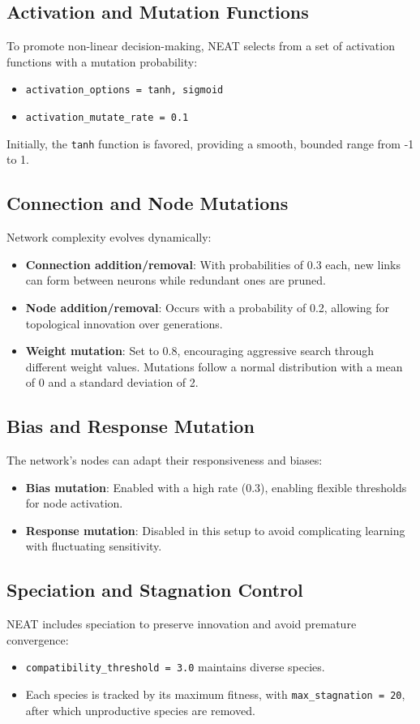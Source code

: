 \documentclass[sigconf]{acmart}
\begin{document}
\subsection{Activation and Mutation Functions}
To promote non-linear decision-making, NEAT selects from a set of activation functions with a mutation probability:
\begin{itemize}
  \item \texttt{activation\_options = tanh, sigmoid}
  \item \texttt{activation\_mutate\_rate = 0.1}
\end{itemize}
Initially, the \texttt{tanh} function is favored, providing a smooth, bounded range from -1 to 1.

\subsection{Connection and Node Mutations}
Network complexity evolves dynamically:
\begin{itemize}
  \item \textbf{Connection addition/removal}: With probabilities of 0.3 each, new links can form between neurons while redundant ones are pruned.
  \item \textbf{Node addition/removal}: Occurs with a probability of 0.2, allowing for topological innovation over generations.
  \item \textbf{Weight mutation}: Set to 0.8, encouraging aggressive search through different weight values. Mutations follow a normal distribution with a mean of 0 and a standard deviation of 2.
\end{itemize}

\subsection{Bias and Response Mutation}
The network’s nodes can adapt their responsiveness and biases:
\begin{itemize}
  \item \textbf{Bias mutation}: Enabled with a high rate (0.3), enabling flexible thresholds for node activation.
  \item \textbf{Response mutation}: Disabled in this setup to avoid complicating learning with fluctuating sensitivity.
\end{itemize}

\subsection{Speciation and Stagnation Control}
NEAT includes speciation to preserve innovation and avoid premature convergence:
\begin{itemize}
  \item \texttt{compatibility\_threshold = 3.0} maintains diverse species.
  \item Each species is tracked by its maximum fitness, with \texttt{max\_stagnation = 20}, after which unproductive species are removed.
\end{itemize}
\end{document}
